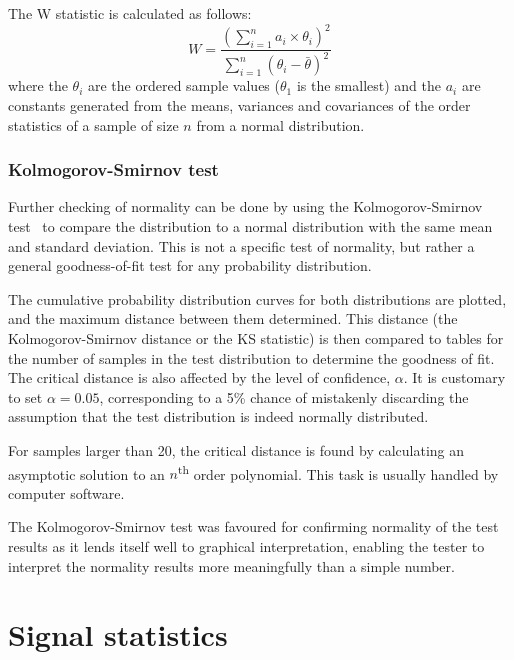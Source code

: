 The W statistic is calculated as follows: 
\begin{equation} 
  \label{eq:shipirowilk} 
  W = \frac{
    \left( \displaystyle \sum_{i=1}^n {a_i \times \theta_i} \right)^2}
  {\displaystyle \sum_{i=1}^n 
    \left ( \theta_i - \bar{\theta} \right )^2}
\end{equation}
where the $\theta_i$ are the ordered sample values ($\theta_1$ is the smallest) and the $a_i$ are constants generated from the means, variances and covariances of the order statistics of a sample of size $n$ from a normal distribution.

\subsubsection{Kolmogorov-Smirnov test}\label{sec:kolm-smirn-test}
Further checking of normality can be done by using the Kolmogorov-Smirnov test~\citep[392--394]{chakravarti.laha.ea1967handbook} to compare the distribution to a normal distribution with the same mean and standard deviation.
This is not a specific test of normality, but rather a general goodness-of-fit test for any probability distribution.

The cumulative probability distribution curves for both distributions are plotted, and the maximum distance between them determined.  
This distance (the Kolmogorov-Smirnov distance or the KS statistic) is then compared to tables for the number of samples in the test distribution to determine the goodness of fit.  
The critical distance is also affected by the level of confidence, $\alpha$.  
It is customary to set $\alpha=\num{0.05}$, corresponding to a 5\% chance of mistakenly discarding the assumption that the test distribution is indeed normally distributed.

For samples larger than 20, the critical distance is found by calculating an asymptotic solution to an $n$\textsuperscript{th} order polynomial.  
This task is usually handled by computer software.

The Kolmogorov-Smirnov test was favoured for confirming normality of the test results as it lends itself well to graphical interpretation, enabling the tester to interpret the normality results more meaningfully than a simple number.

\section{Signal statistics}


